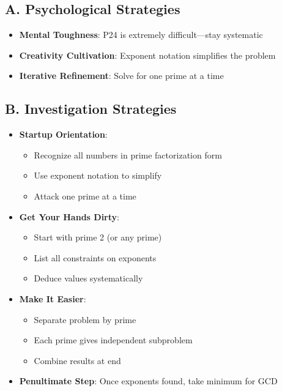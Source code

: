 \documentclass[12pt]{article}
\begin{document}
\begin{strategicbox}
\subsection*{A. Psychological Strategies}
\begin{itemize}[leftmargin=*]
    \item \textbf{Mental Toughness}: P24 is extremely difficult—stay systematic
    \item \textbf{Creativity Cultivation}: Exponent notation simplifies the problem
    \item \textbf{Iterative Refinement}: Solve for one prime at a time
\end{itemize}

\subsection*{B. Investigation Strategies}
\begin{itemize}[leftmargin=*]
    \item \textbf{Startup Orientation}: 
    \begin{itemize}
        \item Recognize all numbers in prime factorization form
        \item Use exponent notation to simplify
        \item Attack one prime at a time
    \end{itemize}
    \item \textbf{Get Your Hands Dirty}: 
    \begin{itemize}
        \item Start with prime 2 (or any prime)
        \item List all constraints on exponents
        \item Deduce values systematically
    \end{itemize}
    \item \textbf{Make It Easier}: 
    \begin{itemize}
        \item Separate problem by prime
        \item Each prime gives independent subproblem
        \item Combine results at end
    \end{itemize}
    \item \textbf{Penultimate Step}: Once exponents found, take minimum for GCD
\end{itemize}


\end{strategicbox}
\end{document}
